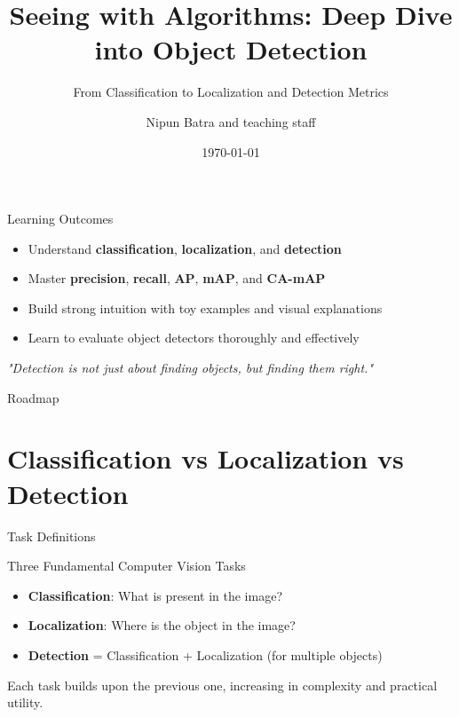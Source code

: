 \documentclass[usenames,dvipsnames]{beamer}
\title{Seeing with Algorithms: Deep Dive into Object Detection}
\subtitle{From Classification to Localization and Detection Metrics}
\date{\today}
\author{Nipun Batra and teaching staff}
\institute{IIT Gandhinagar}
\begin{document}
	\maketitle
	
	
	\begin{frame}{Learning Outcomes}
		\begin{itemize}
			\item Understand \textbf{classification}, \textbf{localization}, and \textbf{detection}
			\item Master \textbf{precision}, \textbf{recall}, \textbf{AP}, \textbf{mAP}, and \textbf{CA-mAP}
			\item Build strong intuition with toy examples and visual explanations
			\item Learn to evaluate object detectors thoroughly and effectively
		\end{itemize}
		
		\vspace{1em}
		\begin{center}
		\textit{"Detection is not just about finding objects, but finding them right."}
		\end{center}
	\end{frame}
	
	\begin{frame}{Roadmap}
		\tableofcontents[hideallsubsections]
	\end{frame}
	
	
	\section{Classification vs Localization vs Detection}
	
	\begin{frame}{Task Definitions}
		\begin{definitionbox}{Three Fundamental Computer Vision Tasks}
			\begin{itemize}
				\item \textbf{Classification}: What is present in the image?
				\item \textbf{Localization}: Where is the object in the image?
				\item \textbf{Detection} = Classification + Localization (for multiple objects)
			\end{itemize}
		\end{definitionbox}
		
		\vspace{1em}
		Each task builds upon the previous one, increasing in complexity and practical utility.
	\end{frame}
	
\end{document}
